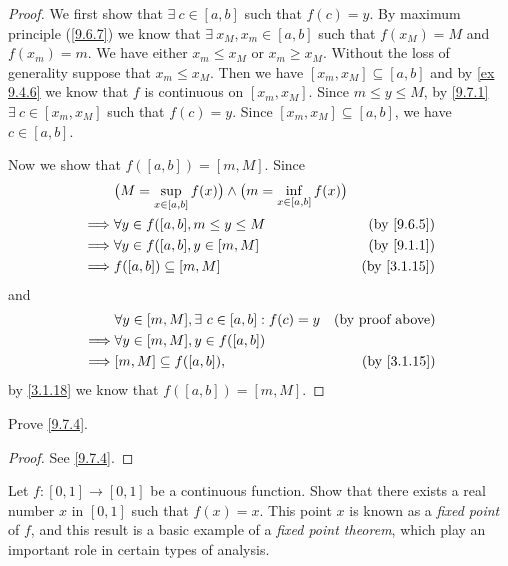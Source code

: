 \begin{proof}
  We first show that \(\exists\ c \in [a, b]\) such that \(f(c) = y\).
  By maximum principle (\cref{9.6.7}) we know that \(\exists\ x_M, x_m \in [a, b]\) such that \(f(x_M) = M\) and \(f(x_m) = m\).
  We have either \(x_m \leq x_M\) or \(x_m \geq x_M\).
  Without the loss of generality suppose that \(x_m \leq x_M\).
  Then we have \([x_m, x_M] \subseteq [a, b]\) and by \cref{ex 9.4.6} we know that \(f\) is continuous on \([x_m, x_M]\).
  Since \(m \leq y \leq M\), by \cref{9.7.1} \(\exists\ c \in [x_m, x_M]\) such that \(f(c) = y\).
  Since \([x_m, x_M] \subseteq [a, b]\), we have \(c \in [a, b]\).

  Now we show that \(f([a, b]) = [m, M]\).
  Since
  \begin{align*}
             & \big(M = \sup_{x \in [a, b]} f(x)\big) \land \big(m = \inf_{x \in [a, b]} f(x)\big)                             \\
    \implies & \forall y \in f([a, b], m \leq y \leq M                                             & \text{(by \cref{9.6.5})}  \\
    \implies & \forall y \in f([a, b], y \in [m, M]                                                & \text{(by \cref{9.1.1})}  \\
    \implies & f([a, b]) \subseteq [m, M]                                                          & \text{(by \cref{3.1.15})}
  \end{align*}
  and
  \begin{align*}
             & \forall y \in [m, M], \exists\ c \in [a, b] : f(c) = y & \text{(by proof above)}   \\
    \implies & \forall y \in [m, M], y \in f([a, b])                                              \\
    \implies & [m, M] \subseteq f([a, b]),                            & \text{(by \cref{3.1.15})}
  \end{align*}
  by \cref{3.1.18} we know that \(f([a, b]) = [m ,M]\).
\end{proof}

\exercisesection

\begin{exercise}\label{ex 9.7.1}
  Prove \cref{9.7.4}.
\end{exercise}

\begin{proof}
  See \cref{9.7.4}.
\end{proof}

\begin{exercise}\label{ex 9.7.2}
  Let \(f : [0, 1] \to [0, 1]\) be a continuous function.
  Show that there exists a real number \(x\) in \([0, 1]\) such that \(f(x) = x\).
  This point \(x\) is known as a \emph{fixed point} of \(f\), and this result is a basic example of a \emph{fixed point theorem}, which play an important role in certain types of analysis.
\end{exercise}

